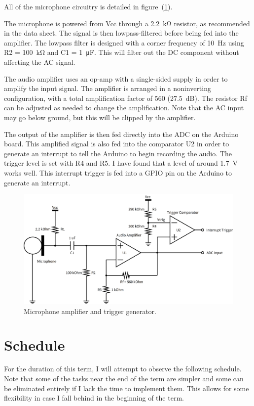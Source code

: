 \documentclass[10pt]{article}
\begin{document}
All of the microphone circuitry is detailed in figure~(\ref{fig:microphone}).

The microphone is powered from Vcc through a \SI{2.2}{\kilo\ohm} resistor,
as recommended in the data sheet. The signal is then lowpass-filtered before
being fed into the amplifier. The lowpass filter is designed with a corner
frequency of \SI{10}{\hertz} using R2 = \SI{100}{\kilo\ohm} and C1 =
\SI{1}{\micro\farad}. This will filter out the DC component without affecting
the AC signal.

The audio amplifier uses an op-amp with a single-sided supply in order to
amplify the input signal. The amplifier is arranged in a noninverting
configuration, with a total amplification factor of 560 (\SI{27.5}{\deci\bel}).
The resistor Rf can be adjusted as needed to change the amplification. Note
that the AC input may go below ground, but this will be clipped by the
amplifier.

The output of the amplifier is then fed directly into the ADC on the Arduino
board. This amplified signal is also fed into the comparator U2 in order to
generate an interrupt to tell the Arduino to begin recording the audio. The
trigger level is set with R4 and R5. I have found that a level of around
\SI{1.7}{\volt} works well. This interrupt trigger is fed into a GPIO pin on the
Arduino to generate an interrupt.

\begin{figure}[h]
    \centering
    \includegraphics[width=0.8\linewidth]{sch/microphone.png}
    \caption{Microphone amplifier and trigger generator.}
\label{fig:microphone}
\end{figure}

\section{Schedule}
\label{sec:schedule}

For the duration of this term, I will attempt to observe the following schedule.
Note that some of the tasks near the end of the term are simpler and some can be
eliminated entirely if I lack the time to implement them. This allows for some
flexibility in case I fall behind in the beginning of the term.
\end{document}
